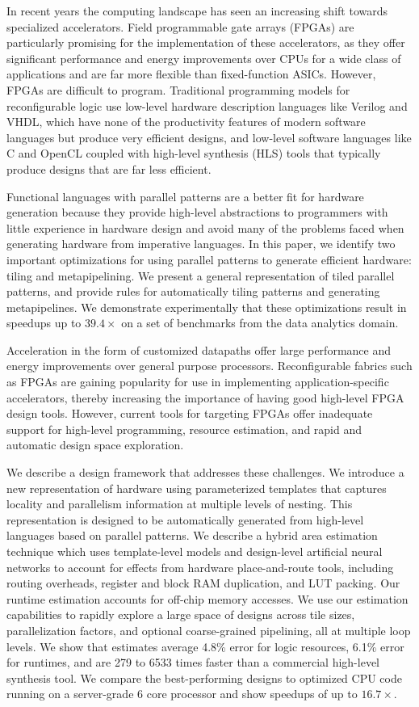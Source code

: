 In recent years the computing landscape has seen an increasing shift towards specialized accelerators. Field programmable gate arrays (FPGAs) are particularly promising for the implementation of these accelerators, as they offer significant performance and energy improvements over CPUs for a wide class of applications and are far more flexible than fixed-function ASICs. However, FPGAs are difficult to program. Traditional programming models for reconfigurable logic use low-level hardware description languages like Verilog and VHDL, which have none of the productivity features of modern software languages but produce very efficient designs, and low-level software languages like C and OpenCL coupled with high-level synthesis (HLS) tools that typically produce designs that are far less efficient.

Functional languages with parallel patterns are a better fit for hardware generation because they provide high-level abstractions
to programmers with little experience in hardware design and avoid many of the problems faced when generating hardware from imperative languages.  In this paper, we identify two important optimizations for using parallel patterns to generate efficient hardware:
tiling and metapipelining.  We present a general representation of tiled parallel patterns, and provide rules for
automatically tiling patterns and generating metapipelines.
We demonstrate experimentally that these optimizations result in speedups up to
$39.4 \times$ on a set of benchmarks from the data analytics domain.

Acceleration in the form of customized datapaths offer large
performance and energy improvements over general purpose
processors. Reconfigurable fabrics such as FPGAs are gaining
popularity for use in implementing application-specific accelerators, thereby
increasing the importance of having good high-level FPGA design
tools. However, current tools for targeting FPGAs offer inadequate
support for high-level programming, resource estimation,
and rapid and automatic design space exploration.

We describe a design framework that addresses these challenges. We
introduce a new representation of hardware using parameterized
templates that captures locality and parallelism information at
multiple levels of nesting. This representation is designed to be
automatically generated from high-level languages based on parallel
patterns. We describe a hybrid area estimation
technique which uses template-level models and design-level artificial neural networks
to account for effects from hardware
place-and-route tools, including routing overheads, register and block RAM
duplication, and LUT packing. Our runtime estimation accounts for
off-chip memory accesses.  We use our estimation capabilities to
rapidly explore a large space of designs across tile sizes,
parallelization factors, and optional coarse-grained pipelining, all
at multiple loop levels. We show that estimates average 4.8\% error for
logic resources, 6.1\% error for runtimes, and are 279 to 6533 times faster
than a commercial high-level synthesis tool. We compare the
best-performing designs to optimized CPU code running on a
server-grade 6 core processor and show speedups of up to $16.7\times$.


